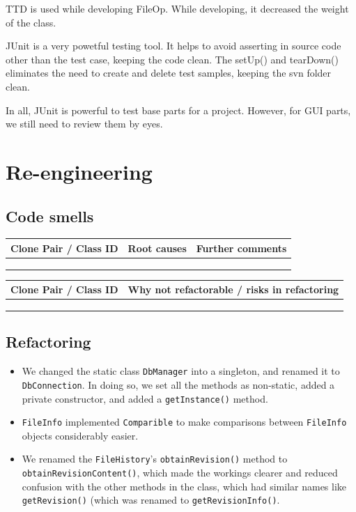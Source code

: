 \documentclass[12pt,a4paper]{article}
\newcommand\todonote[1]{{\color{red}\fbox{\parbox{\dimexpr\linewidth-2\fboxsep-2\fboxrule}{\textit\large{\textbf{TODO: #1}}}}}}
\begin{document}
TTD is used while developing FileOp.  While developing, it decreased the weight of the class.

JUnit is a very powetful testing tool. It helps to avoid asserting in source code other than the test case, keeping the code clean. The setUp() and tearDown() eliminates the need to create and delete test samples, keeping the svn folder clean.

In all, JUnit is powerful to test base parts for a project. However, for GUI parts, we still need to review them by eyes.


\section{Re-engineering}

\subsection{Code smells}
\todonote{Done by Mike}

\begin{longtable}{| p{2.75cm} | p{4cm} | p{8cm} |}
  \hline
  \textbf{Clone Pair / Class ID} & \textbf{Root causes} & \textbf{Further comments} \\ \hline
    &  &   \\ \hline
    &  &   \\ \hline
    &  &   \\ \hline
\end{longtable}

\begin{longtable}{| p{2.75cm} | p{12.5cm} |}
  \hline
  \textbf{Clone Pair / Class ID} & \textbf{Why not refactorable / risks in refactoring} \\ \hline
    &   \\ \hline
    &   \\ \hline
    &   \\ \hline
\end{longtable}

\subsection{Refactoring}
\begin{itemize}
\item We changed the static class \texttt{DbManager} into a singleton, and renamed it to \texttt{DbConnec\-tion}. In doing so, we set all the methods as non-static, added a private constructor, and added a \texttt{getInstance()} method.
\item \texttt{FileInfo} implemented \texttt{Comparible} to make comparisons between \texttt{FileInfo} objects considerably easier.
\item We renamed the \texttt{FileHistory}'s \texttt{obtainRevision()} method to \texttt{obtainRevisionCo\-ntent()}, which made the workings clearer and reduced confusion with the other methods in the class, which had similar names like \texttt{getRevision()} (which was renamed to \texttt{getRevisionInfo()}.
\end{itemize}
\end{document}
